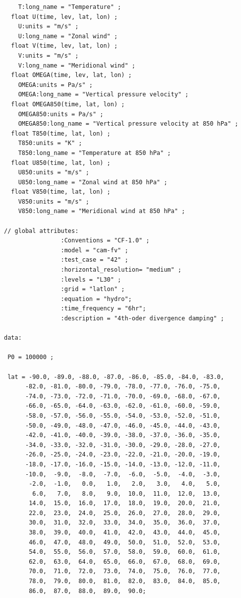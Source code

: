 \documentclass[times,doublespace]{fldauth}
\begin{document}
{\begin{appendix}
\begin{verbatim}
    T:long_name = "Temperature" ;
  float U(time, lev, lat, lon) ;
    U:units = "m/s" ;
    U:long_name = "Zonal wind" ;
  float V(time, lev, lat, lon) ;
    V:units = "m/s" ;
    V:long_name = "Meridional wind" ;
  float OMEGA(time, lev, lat, lon) ;
    OMEGA:units = Pa/s" ;
    OMEGA:long_name = "Vertical pressure velocity" ;
  float OMEGA850(time, lat, lon) ;
    OMEGA850:units = Pa/s" ;
    OMEGA850:long_name = "Vertical pressure velocity at 850 hPa" ;
  float T850(time, lat, lon) ;
    T850:units = "K" ;
    T850:long_name = "Temperature at 850 hPa" ;
  float U850(time, lat, lon) ;
    U850:units = "m/s" ;
    U850:long_name = "Zonal wind at 850 hPa" ;
  float V850(time, lat, lon) ;
    V850:units = "m/s" ;
    V850:long_name = "Meridional wind at 850 hPa" ;
    
// global attributes:
                :Conventions = "CF-1.0" ;
                :model = "cam-fv" ;
                :test_case = "42" ;
                :horizontal_resolution= "medium" ;
                :levels = "L30" ;
                :grid = "latlon" ;
                :equation = "hydro";
                :time_frequency = "6hr";
                :description = "4th-oder divergence damping" ;

data:

 P0 = 100000 ;

 lat = -90.0, -89.0, -88.0, -87.0, -86.0, -85.0, -84.0, -83.0, 
      -82.0, -81.0, -80.0, -79.0, -78.0, -77.0, -76.0, -75.0, 
      -74.0, -73.0, -72.0, -71.0, -70.0, -69.0, -68.0, -67.0, 
      -66.0, -65.0, -64.0, -63.0, -62.0, -61.0, -60.0, -59.0, 
      -58.0, -57.0, -56.0, -55.0, -54.0, -53.0, -52.0, -51.0, 
      -50.0, -49.0, -48.0, -47.0, -46.0, -45.0, -44.0, -43.0, 
      -42.0, -41.0, -40.0, -39.0, -38.0, -37.0, -36.0, -35.0, 
      -34.0, -33.0, -32.0, -31.0, -30.0, -29.0, -28.0, -27.0, 
      -26.0, -25.0, -24.0, -23.0, -22.0, -21.0, -20.0, -19.0, 
      -18.0, -17.0, -16.0, -15.0, -14.0, -13.0, -12.0, -11.0, 
      -10.0,  -9.0,  -8.0,  -7.0,  -6.0,  -5.0,  -4.0,  -3.0, 
       -2.0,  -1.0,   0.0,   1.0,   2.0,   3.0,   4.0,   5.0, 
        6.0,   7.0,   8.0,   9.0,  10.0,  11.0,  12.0,  13.0, 
       14.0,  15.0,  16.0,  17.0,  18.0,  19.0,  20.0,  21.0, 
       22.0,  23.0,  24.0,  25.0,  26.0,  27.0,  28.0,  29.0, 
       30.0,  31.0,  32.0,  33.0,  34.0,  35.0,  36.0,  37.0, 
       38.0,  39.0,  40.0,  41.0,  42.0,  43.0,  44.0,  45.0, 
       46.0,  47.0,  48.0,  49.0,  50.0,  51.0,  52.0,  53.0, 
       54.0,  55.0,  56.0,  57.0,  58.0,  59.0,  60.0,  61.0, 
       62.0,  63.0,  64.0,  65.0,  66.0,  67.0,  68.0,  69.0, 
       70.0,  71.0,  72.0,  73.0,  74.0,  75.0,  76.0,  77.0, 
       78.0,  79.0,  80.0,  81.0,  82.0,  83.0,  84.0,  85.0, 
       86.0,  87.0,  88.0,  89.0,  90.0;


\end{verbatim}
\end{appendix}}
\end{document}
